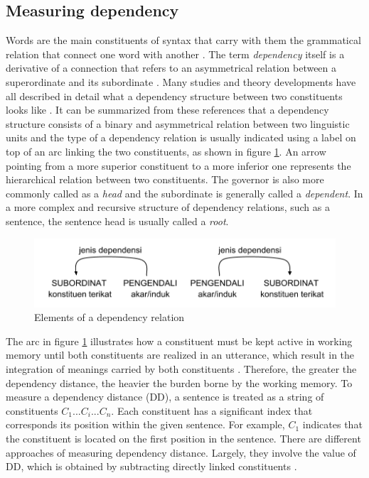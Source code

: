 \documentclass[10pt, a4paper, conference, compsocconf]{IEEEtran}
\begin{document}

\subsection{Measuring dependency}

Words are the main constituents of syntax that carry with them the grammatical relation that connect one word with another \cite{tesniere1959elements}. The term \textit{dependency} itself is a derivative of a connection that refers to an asymmetrical relation between a superordinate and its subordinate \cite{hudson1984word, heringer1993dependency, tesniere1959elements}. Many studies and theory developments have all described in detail what a dependency structure between two constituents looks like \cite{tesniere1959elements, hudson1984word, liu2009chinese}. It can be summarized from these references that a dependency structure consists of a binary and asymmetrical relation between two linguistic units and the type of a dependency relation is usually indicated using a label on top of an arc linking the two constituents, as shown in figure \ref{fig:tautandependensi}. An arrow pointing from a more superior constituent to a more inferior one represents the hierarchical relation between two constituents. The governor is also more commonly called as a \textit{head} and the subordinate is generally called a \textit{dependent}. In a more complex and recursive structure of dependency relations, such as a sentence, the sentence head is usually called a \textit{root}.

\begin{figure}
	\centering \includegraphics[width=0.45
	\textwidth] {pics/tautandependensi.png} \caption{Elements of a dependency relation} 
\label{fig:tautandependensi} \end{figure}

The arc in figure \ref{fig:tautandependensi} illustrates how a constituent must be kept active in working memory until both constituents are realized in an utterance, which result in the integration of meanings carried by both constituents \cite{hudson2003psychological, liu2008dependency}. Therefore, the greater the dependency distance, the heavier the burden borne by the working memory. To measure a dependency distance (DD), a sentence is treated as a string of constituents $C_{1}...C_{i}...C_{n}$. Each constituent has a significant index that corresponds its position within the given sentence. For example, $C_{1}$ indicates that the constituent is located on the first position in the sentence. There are different approaches of measuring dependency distance. Largely, they involve the value of DD, which is obtained by subtracting directly linked constituents \cite{liu2008dependency, liu2017dependency, futrell2015large}.
\end{document}
